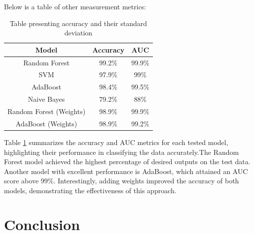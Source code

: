 \documentclass[conference]{IEEEtran}
\begin{document}

Below is a table of other measurement metrics:

\begin{table}[H]
    \caption{Table presenting accuracy and their standard deviation}
    \begin{center}
        \begin{tabular}{|c|c|c|}
            \hline
            \textbf{Model} & \textbf{Accuracy} & \textbf{AUC} \\
            \hline
            Random Forest & 99.2\% & 99.9\%\\
            SVM & 97.9\% & 99\%\\
            AdaBoost & 98.4\% &  99.5\%\\
            Naive Bayes & 79.2\% & 88\%\\
            Random Forest (Weights) & 98.9\% &99.9\% \\
            AdaBoost (Weights) & 98.9\% & 99.2\%\\
            \hline
        \end{tabular}
    \end{center}
    \label{AUC_tab}
\end{table}
Table \ref{AUC_tab} summarizes the accuracy and AUC metrics
for each tested model, highlighting their performance in
classifying the data accurately.The Random Forest model achieved
the highest percentage of desired outputs on the test data.
Another model with excellent performance is AdaBoost,
which attained an AUC score above 99\%. Interestingly,
adding weights improved the accuracy of both models,
demonstrating the effectiveness of this approach.


\section{Conclusion}
\end{document}
